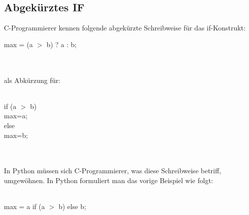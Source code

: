 \subsection{Abgekürztes IF}
C-Programmierer kennen folgende abgekürzte Schreibweise für das if-Konstrukt: \\
\begin{MyConsoleBox}{
max = (a $>$ b) ? a : b; 
}\end{MyConsoleBox}
\\
\\
als Abkürzung für: \\
\\
\begin{MyConsoleBox}{
if (a $>$ b) \\
   max=a;  \\
else       \\
   max=b;  \\
}\end{MyConsoleBox}
\\
\\
In Python müssen sich C-Programmierer, was diese Schreibweise betriff, umgewöhnen. In Python formuliert man das vorige Beispiel wie folgt:\\
\\
\begin{MyConsoleBox}{
max = a if (a $>$ b) else b;
}\end{MyConsoleBox}
\\
